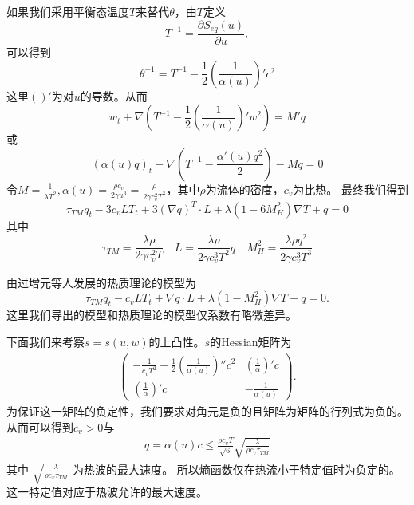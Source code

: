 如果我们采用平衡态温度$T$来替代$\theta$，由$T$定义
\begin{equation*}
	T^{-1}=\frac{\partial S_{eq}(u)}{\partial u},
\end{equation*}
可以得到
\begin{equation}
\theta^{-1}=T^{-1}-\frac{1}{2}(\frac{1}{\alpha(u)})'{c}^2
\end{equation}
这里$()'$为对$u$的导数。从而
\begin{equation*}
{w}_t+\nabla(T^{-1}-\frac{1}{2}(\frac{1}{\alpha(u)})' {w}^2)=M'{q}
\end{equation*}
或
\begin{equation*}
({\alpha(u)}{{q}})_t-\nabla(T^{-1}- \frac{\alpha'(u){q}^2}{2})-M{q}=0
\end{equation*}
令$M=\frac{1}{\lambda T^2}, \alpha(u)=\frac{\rho c_v}{2\gamma u^3}=\frac{\rho}{2\gamma c_v^2 T^3}$，其中$\rho$为流体的密度，$c_v$为比热。
最终我们得到
\begin{equation}
\tau_{TM} {q}_t-3c_v {L}T_t+3(\nabla {q})^T \cdot {L}+\lambda(1-6M_H^2)\nabla T+{q}=0
\end{equation}
其中
\begin{equation*}
\tau_{TM}=\frac{\lambda \rho}{2 \gamma c_v^2 T} \quad {L}=\frac{\lambda \rho}{2 \gamma c_v^3 T^2}{q} \quad M_H^2=\frac{\lambda \rho {q}^2}{2\gamma c_v^3 T^3}
\end{equation*}

由过增元等人发展的热质理论的模型为\cite{dong2011generalized,zeng2006motion,sellitto2013entropy}
\begin{equation}
\tau_{TM} {q}_t-c_v {L}T_t+\nabla {q} \cdot {L}+\lambda(1-M_H^2)\nabla T+{q}=0.
\end{equation}
这里我们导出的模型和热质理论的模型仅系数有略微差异。

下面我们来考察$s=s(u,w)$的上凸性。$s$的Hessian矩阵为
\begin{eqnarray*}
\left( \begin{array}{ll} -\frac{1}{c_v T^2}-\frac{1}{2}(\frac{1}{\alpha(u)})'' {c}^2 & (\frac{1}{\alpha})'{c} \\ (\frac{1}{\alpha})'{c} & -\frac{1}{\alpha(u)} \end{array} \right).
\end{eqnarray*}
为保证这一矩阵的负定性，我们要求对角元是负的且矩阵为矩阵的行列式为负的。从而可以得到$c_v >0$与
\begin{eqnarray*}
{q}=\alpha(u){c} \le \frac{\rho c_v T}{\sqrt{6}} \sqrt{\frac{\lambda}{\rho c_v \tau_{TM}}}
\end{eqnarray*}
其中 $\sqrt{\frac{\lambda}{\rho c_v \tau_{TM}}}$ 为热波的最大速度\cite{jou1996extended}。 所以熵函数仅在热流小于特定值时为负定的。这一特定值对应于热波允许的最大速度。

